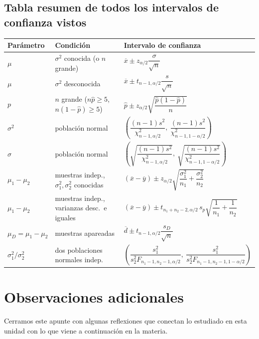 \documentclass[11pt,a4paper]{article}
\theoremstyle{plain}
\theoremstyle{definition}
\theoremstyle{remark}
\begin{document}
\subsection{Tabla resumen de todos los intervalos de confianza vistos}

\begin{center}
\small
\begin{tabular}{p{2.6cm}p{4.6cm}p{7cm}}
\toprule
\textbf{Parámetro} & \textbf{Condición} & \textbf{Intervalo de confianza} \\
\midrule
$\mu$ & $\sigma^2$ conocida (o $n$ grande) & $\overline x \pm z_{\alpha/2}\dfrac{\sigma}{\sqrt n}$ \\[1.4ex]
$\mu$ & $\sigma^2$ desconocida & $\overline x \pm t_{n-1,\alpha/2}\dfrac{s}{\sqrt n}$ \\[1.4ex]
$p$ & $n$ grande ($n\widehat p\ge 5$, $n(1-\widehat p)\ge 5$) & $\widehat p \pm z_{\alpha/2}\sqrt{\dfrac{\widehat p(1-\widehat p)}{n}}$ \\[1.4ex]
$\sigma^2$ & población normal & $\left(\dfrac{(n-1)s^2}{\chi^2_{n-1,\alpha/2}},\ \dfrac{(n-1)s^2}{\chi^2_{n-1,1-\alpha/2}}\right)$ \\[1.8ex]
$\sigma$ & población normal & $\left(\sqrt{\dfrac{(n-1)s^2}{\chi^2_{n-1,\alpha/2}}},\ \sqrt{\dfrac{(n-1)s^2}{\chi^2_{n-1,1-\alpha/2}}}\right)$ \\[1.8ex]
$\mu_1-\mu_2$ & muestras indep., $\sigma_1^2,\sigma_2^2$ conocidas & $(\overline x-\overline y)\pm z_{\alpha/2}\sqrt{\dfrac{\sigma_1^2}{n_1}+\dfrac{\sigma_2^2}{n_2}}$ \\[1.8ex]
$\mu_1-\mu_2$ & muestras indep., varianzas desc.\ e iguales & $(\overline x-\overline y)\pm t_{n_1+n_2-2,\alpha/2}\,s_p\sqrt{\dfrac1{n_1}+\dfrac1{n_2}}$ \\[1.8ex]
$\mu_D=\mu_1-\mu_2$ & muestras apareadas & $\overline d \pm t_{n-1,\alpha/2}\dfrac{s_D}{\sqrt n}$ \\[1.4ex]
$\sigma_1^2/\sigma_2^2$ & dos poblaciones normales indep. & $\left(\dfrac{s_1^2}{s_2^2 F_{n_1-1,n_2-1,\alpha/2}},\ \dfrac{s_1^2}{s_2^2 F_{n_1-1,n_2-1,1-\alpha/2}}\right)$ \\
\bottomrule
\end{tabular}
\end{center}

\section{Observaciones adicionales}

Cerramos este apunte con algunas reflexiones que conectan lo estudiado en esta unidad con lo que viene a continuación en la materia.
\end{document}
